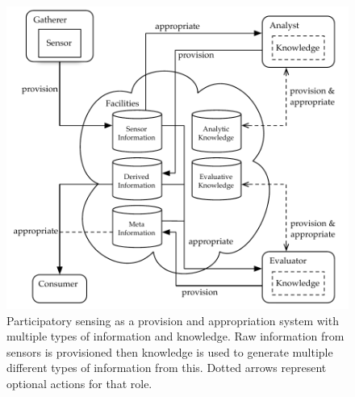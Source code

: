 \begin{figure}
\includegraphics[width=\linewidth]{gfx/Prov_and_app_sys_diag_expanded}
\caption[Participatory sensing as a provision and appropriation with multiple types of information and knowledge.]{Participatory sensing as a provision and appropriation system with multiple types of information and knowledge. Raw information from sensors is provisioned then knowledge is used to generate multiple different types of information from this. Dotted arrows represent optional actions for that role.}\label{fig:psysex}
\end{figure}




